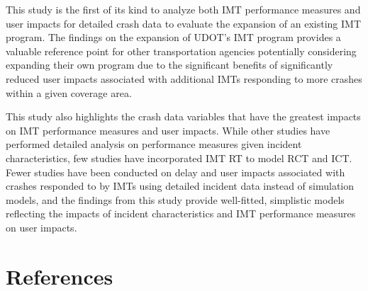 \documentclass[
  letterpaper,
  authoryear]{elsarticle}
\begin{document}
This study is the first of its kind to analyze both IMT performance
measures and user impacts for detailed crash data to evaluate the
expansion of an existing IMT program. The findings on the expansion of
UDOT's IMT program provides a valuable reference point for other
transportation agencies potentially considering expanding their own
program due to the significant benefits of significantly reduced user
impacts associated with additional IMTs responding to more crashes
within a given coverage area.

This study also highlights the crash data variables that have the
greatest impacts on IMT performance measures and user impacts. While
other studies have performed detailed analysis on performance measures
given incident characteristics, few studies have incorporated IMT RT to
model RCT and ICT. Fewer studies have been conducted on delay and user
impacts associated with crashes responded to by IMTs using detailed
incident data instead of simulation models, and the findings from this
study provide well-fitted, simplistic models reflecting the impacts of
incident characteristics and IMT performance measures on user impacts.


\section*{References}\label{references}


\renewcommand{\bibsection}{}

\end{document}

